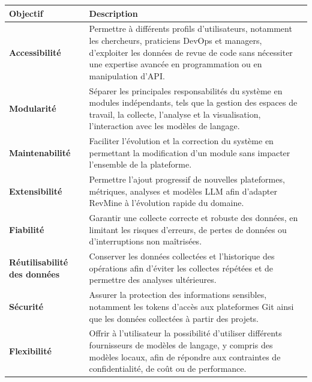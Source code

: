 \begin{tabularx}{\textwidth}{|l|X|}
\hline
\textbf{Objectif} & \textbf{Description} \\ \hline

\textbf{Accessibilité} & Permettre à différents profils d’utilisateurs, notamment les chercheurs, praticiens DevOps et managers, d’exploiter les données de revue de code sans nécessiter une expertise avancée en programmation ou en manipulation d’API. \\ \hline

\textbf{Modularité} & Séparer les principales responsabilités du système en modules indépendants, tels que la gestion des espaces de travail, la collecte, l’analyse et la visualisation, l’interaction avec les modèles de langage. \\ \hline

\textbf{Maintenabilité} & Faciliter l’évolution et la correction du système en permettant la modification d’un module sans impacter l’ensemble de la plateforme. \\ \hline

\textbf{Extensibilité} & Permettre l’ajout progressif de nouvelles plateformes, métriques, analyses et modèles LLM afin d’adapter RevMine à l’évolution rapide du domaine. \\ \hline

\textbf{Fiabilité} & Garantir une collecte correcte et robuste des données, en limitant les risques d’erreurs, de pertes de données ou d’interruptions non maîtrisées. \\ \hline

\textbf{Réutilisabilité des données} & Conserver les données collectées et l’historique des opérations afin d’éviter les collectes répétées et de permettre des analyses ultérieures. \\ \hline

\textbf{Sécurité} & Assurer la protection des informations sensibles, notamment les tokens d’accès aux plateformes Git ainsi que les données collectées à partir des projets. \\ \hline

\textbf{Flexibilité} & Offrir à l’utilisateur la possibilité d’utiliser différents fournisseurs de modèles de langage, y compris des modèles locaux, afin de répondre aux contraintes de confidentialité, de coût ou de performance. \\ \hline

\end{tabularx}

